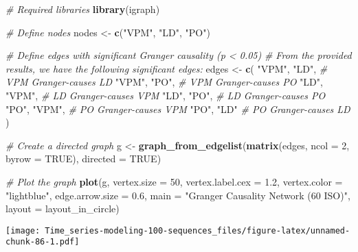\documentclass[
]{article}
\newenvironment{Shaded}{\begin{snugshade}}{\end{snugshade}}
\newcommand{\AttributeTok}[1]{\textcolor[rgb]{0.13,0.29,0.53}{#1}}
\newcommand{\CommentTok}[1]{\textcolor[rgb]{0.56,0.35,0.01}{\textit{#1}}}
\newcommand{\ConstantTok}[1]{\textcolor[rgb]{0.56,0.35,0.01}{#1}}
\newcommand{\DecValTok}[1]{\textcolor[rgb]{0.00,0.00,0.81}{#1}}
\newcommand{\FloatTok}[1]{\textcolor[rgb]{0.00,0.00,0.81}{#1}}
\newcommand{\FunctionTok}[1]{\textcolor[rgb]{0.13,0.29,0.53}{\textbf{#1}}}
\newcommand{\NormalTok}[1]{#1}
\newcommand{\OtherTok}[1]{\textcolor[rgb]{0.56,0.35,0.01}{#1}}
\newcommand{\StringTok}[1]{\textcolor[rgb]{0.31,0.60,0.02}{#1}}
\begin{document}
\begin{Shaded}
\begin{Highlighting}[]
\CommentTok{\# Required libraries}
\FunctionTok{library}\NormalTok{(igraph)}

\CommentTok{\# Define nodes}
\NormalTok{nodes }\OtherTok{\textless{}{-}} \FunctionTok{c}\NormalTok{(}\StringTok{"VPM"}\NormalTok{, }\StringTok{"LD"}\NormalTok{, }\StringTok{"PO"}\NormalTok{)}

\CommentTok{\# Define edges with significant Granger causality (p \textless{} 0.05)}
\CommentTok{\# From the provided results, we have the following significant edges:}
\NormalTok{edges }\OtherTok{\textless{}{-}} \FunctionTok{c}\NormalTok{(}
  \StringTok{"VPM"}\NormalTok{, }\StringTok{"LD"}\NormalTok{,  }\CommentTok{\# VPM Granger{-}causes LD}
  \StringTok{"VPM"}\NormalTok{, }\StringTok{"PO"}\NormalTok{,  }\CommentTok{\# VPM Granger{-}causes PO}
  \StringTok{"LD"}\NormalTok{, }\StringTok{"VPM"}\NormalTok{,  }\CommentTok{\# LD Granger{-}causes VPM}
  \StringTok{"LD"}\NormalTok{, }\StringTok{"PO"}\NormalTok{,   }\CommentTok{\# LD Granger{-}causes PO}
  \StringTok{"PO"}\NormalTok{, }\StringTok{"VPM"}\NormalTok{,  }\CommentTok{\# PO Granger{-}causes VPM}
  \StringTok{"PO"}\NormalTok{, }\StringTok{"LD"}    \CommentTok{\# PO Granger{-}causes LD}
\NormalTok{)}

\CommentTok{\# Create a directed graph}
\NormalTok{g }\OtherTok{\textless{}{-}} \FunctionTok{graph\_from\_edgelist}\NormalTok{(}\FunctionTok{matrix}\NormalTok{(edges, }\AttributeTok{ncol =} \DecValTok{2}\NormalTok{, }\AttributeTok{byrow =} \ConstantTok{TRUE}\NormalTok{), }\AttributeTok{directed =} \ConstantTok{TRUE}\NormalTok{)}

\CommentTok{\# Plot the graph}
\FunctionTok{plot}\NormalTok{(g,}
     \AttributeTok{vertex.size =} \DecValTok{50}\NormalTok{,}
     \AttributeTok{vertex.label.cex =} \FloatTok{1.2}\NormalTok{,}
     \AttributeTok{vertex.color =} \StringTok{"lightblue"}\NormalTok{,}
     \AttributeTok{edge.arrow.size =} \FloatTok{0.6}\NormalTok{,}
     \AttributeTok{main =} \StringTok{"Granger Causality Network (60 ISO)"}\NormalTok{,}
     \AttributeTok{layout =}\NormalTok{ layout\_in\_circle)}
\end{Highlighting}
\end{Shaded}

\texttt{[image: Time\_series-modeling-100-sequences\_files/figure-latex/unnamed-chunk-86-1.pdf]}
\end{document}
